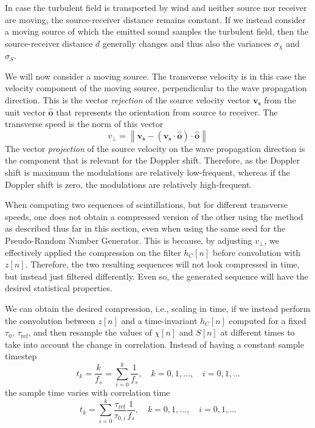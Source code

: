 In case the turbulent field is transported by wind and neither source nor
receiver are moving, the source-receiver distance remains constant. If we
instead consider a moving source of which the emitted sound samples the turbulent field, then the
source-receiver distance $d$ generally changes and thus also the variances $\sigma_{\chi}$ and $\sigma_{S}$.

We will now consider a moving source. The transverse velocity is in this case
the velocity component of the moving source, perpendicular to the wave
propagation direction. This is the vector \emph{rejection} of the source
velocity vector $\mathbf{v_s}$ from the unit vector $\mathbf{\hat{o}}$ that
represents the orientation from source to receiver. The transverse speed is the
norm of this vector
\begin{equation}
 v_{\bot} = \left\| \mathbf{v_s} - (\mathbf{v_s} \cdot  \mathbf{\hat{o}} ) \cdot \mathbf{\hat{o}}  \right\|
\end{equation}
The vector \emph{projection} of the source velocity on the wave propagation
direction is the component that is relevant for the Doppler shift. Therefore, as
the Doppler shift is maximum the modulations are relatively low-frequent,
whereas if the Doppler shift is zero, the modulations are relatively
high-frequent.

When computing two sequences of scintillations, but for different
transverse speeds, one does not obtain a compressed version of the other using
the method as described thus far in this section, even when using the same seed
for the Pseudo-Random Number Generator. This is because, by adjusting $v_{\bot}$,
we effectively applied the compression on the filter $h_C[n]$ before convolution
with $z[n]$. Therefore, the two resulting sequences will not look compressed in
time, but instead just filtered differently. Even so, the generated sequence will
have the desired statistical properties.

We can obtain the desired compression, i.e., scaling in time, if we instead
perform the convolution between $z[n]$ and a time-invariant $h_C[n]$ computed for a fixed $\tau_0$, $\tau_{\mathrm{ref}}$, and then
resample the values of $\chi[n]$ and $S[n]$ at different times to take into
account the change in correlation. Instead of having a constant sample timestep
\begin{equation}
 t_k = \frac{k}{f_s} = \sum_{i=0}^k \frac{1}{f_s}, \quad k=0, 1, \dots, \quad i=0, 1, \dots
\end{equation}
the sample time varies with correlation time
\begin{equation}
  t_k = \sum_{i=0}^k \frac{\tau_{\mathrm{ref}}}{\tau_{0,i}} \frac{1}{f_s} , \quad k=0, 1, \dots, \quad i=0, 1, \dots
\end{equation}

